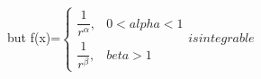 \documentclass[preview]{standalone}
\begin{document}
\begin{center}
but f(x)=$\begin{cases} \dfrac{1}{r^\alpha} , & 0< alpha <1 \\  \dfrac{1}{r^\beta} , & beta > 1 \end{cases} is integrable$
\end{center}
\end{document}
